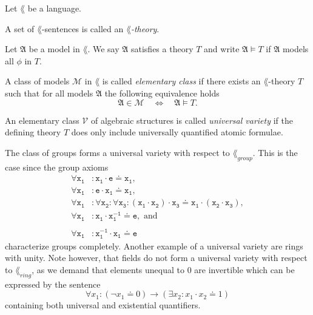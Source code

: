 \begin{defin}
  Let \(\lang\) be a language.
  \begin{thmlist}
    \item A set of \(\lang\)-sentences is called an \emph{\(\lang\)-theory}.

    \item Let \(\mathfrak{A}\) be a model in \(\lang\). We say \(\mathfrak{A}\)
    satisfies a theory \(T\) and write \(\mathfrak{A} \models T\) if
    \(\mathfrak{A}\) models all \(ϕ\) in \(T\).

    \item A class of models \(\mathcal{M}\) in \(\lang\) is called
    \emph{elementary class} if there exists an \(\lang\)-theory \(T\) such that
    for all models
    \(\mathfrak{A}\) the following equivalence holds
    \[
      \mathfrak{A} ∈ \mathcal{M} \quad ⇔ \quad \mathfrak{A} \models T.
    \]

    \item An elementary class \(\mathcal{V}\) of algebraic structures is called
    \emph{universal variety} if the defining theory \(T\) does only include
    universally quantified atomic formulae.
  \end{thmlist}
\end{defin}

\begin{exam}
  The class of groups forms a universal variety with respect to
  \(\lang_{group}\). This is the case since the group axioms
  \begin{align*}
     \mathtt{∀ x_1 } & \mathtt{: x_1 \cdot e \doteq x_1},\\
     \mathtt{∀ x_1 } & \mathtt{: e \cdot x_1 \doteq x_1},\\
     \mathtt{∀ x_1 } & \mathtt{: ∀ x_2 : ∀ x_3 :
             (x_1 \cdot x_2) \cdot x_3 \doteq x_1 \cdot (x_2 \cdot x_3)},\\
     \mathtt{∀ x_1 } & \mathtt{: x_1 \cdot x_1^{-1} \doteq e}, \text{ and}\\\\
     \mathtt{∀ x_1 } & \mathtt{: x_1^{-1} \cdot x_1 \doteq e}
  \end{align*}
  characterize groups completely. Another example of a universal variety are
  rings with unity. Note however, that fields do not form a universal variety with
  respect to \(\lang_{ring}\), as we demand that elements unequal to \(0\) are
  invertible which can be expressed by the sentence
  \[
    ∀ x_1 : (¬ x_1 \doteq 0) → (∃ x_2 : x_1 \cdot x_2 \doteq 1)
  \]
  containing both universal and existential quantifiers.
\end{exam}


